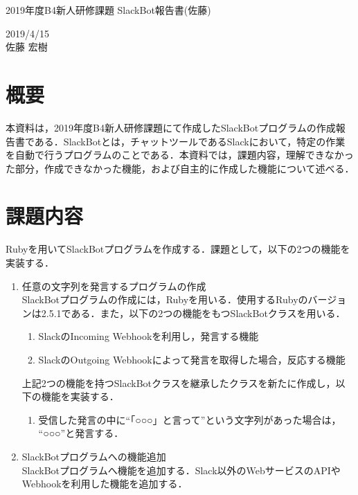 \documentclass[12pt]{jsarticle}
\begin{document}
\begin{center}
{\LARGE 2019年度B4新人研修課題 SlackBot報告書(佐藤)}
\end{center}

\begin{flushright}
  2019/4/15\\
  佐藤 宏樹
\end{flushright}
\section{概要}
\label{sec:introduction}
本資料は，2019年度B4新人研修課題にて作成したSlackBotプログラムの作成報告書である．SlackBotとは，チャットツールであるSlack\cite{slack}において，特定の作業を自動で行うプログラムのことである．本資料では，課題内容，理解できなかった部分，作成できなかった機能，および自主的に作成した機能について述べる．

\section{課題内容}
Rubyを用いてSlackBotプログラムを作成する．課題として，以下の2つの機能を実装する．

\begin{enumerate}
\item 任意の文字列を発言するプログラムの作成\\
  SlackBotプログラムの作成には，Rubyを用いる．使用するRubyのバージョンは2.5.1である．また，以下の2つの機能をもつSlackBotクラスを用いる．
  \begin{enumerate}
  \item SlackのIncoming Webhook\cite{slack-incoming}を利用し，発言する機能
  \item SlackのOutgoing Webhook\cite{slack-outgoing}によって発言を取得した場合，反応する機能
  \end{enumerate}
  上記2つの機能を持つSlackBotクラスを継承したクラスを新たに作成し，以下の機能を実装する．
  \begin{enumerate}
  \item 受信した発言の中に``「○○○」と言って''という文字列があった場合は， ``○○○''と発言する．
  \end{enumerate}
\item SlackBotプログラムへの機能追加\\
  SlackBotプログラムへ機能を追加する．Slack以外のWebサービスのAPIやWebhookを利用した機能を追加する．
\end{enumerate}
\end{document}
